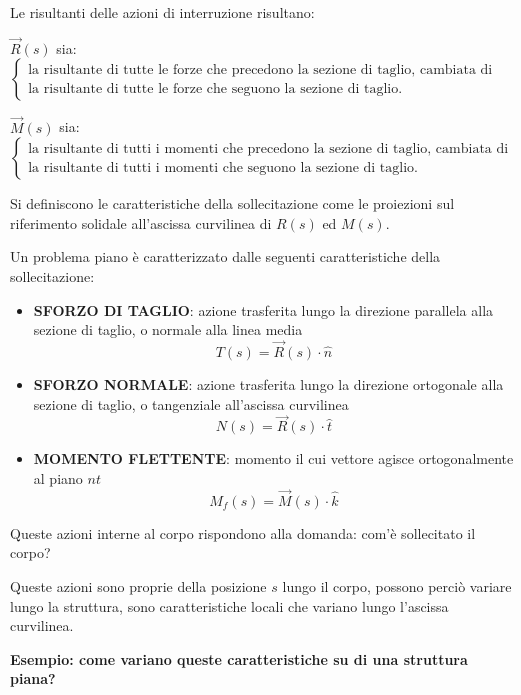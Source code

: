 \documentclass{article}
\begin{document}
\begin{adjustwidth}{2in}{}
	Le risultanti delle azioni di interruzione risultano: \newline 

 $\vec{R}(s)$ sia:{\small  \mbox{$
 	\begin{cases}
 		\text{la risultante di tutte le forze che precedono la sezione di taglio,  cambiata di segno;} \\
 		\text{la risultante di tutte le forze che seguono la sezione di taglio. }
 	\end{cases}$}}\newline

 $\vec{M}(s)$ sia:{\small  \mbox{$
 		\begin{cases}
 			\text{la risultante di tutti i momenti che precedono la sezione di taglio, cambiata di segno;} \\
 			\text{la risultante di tutti i momenti che seguono la sezione di taglio. }
 		\end{cases}$}}\newline

	Si definiscono le caratteristiche della sollecitazione come le proiezioni sul riferimento solidale all’ascissa
	curvilinea di $ R(s) $ ed $ M(s) $.	\newline 
	
	Un problema piano è caratterizzato dalle seguenti caratteristiche della sollecitazione:

\begin{itemize}
	\item \textbf{SFORZO DI TAGLIO}: azione trasferita lungo la direzione parallela alla sezione di taglio, o normale alla linea media
	\[
	T(s) = \vec{R}(s) \cdot \hat{n}
	\]
	\item \textbf{SFORZO NORMALE}: azione trasferita lungo la direzione ortogonale alla sezione di taglio, o tangenziale all'ascissa curvilinea
	\[
	N(s) = \vec{R}(s) \cdot \hat{t}
	\]
	\item \textbf{MOMENTO FLETTENTE}: momento il cui vettore agisce ortogonalmente al piano $ nt $
	\[
	M_f(s) = \vec{M}(s) \cdot \hat{k}
	\]
\end{itemize}

	Queste azioni interne al corpo rispondono alla domanda: com'è sollecitato il corpo? 
	
	Queste azioni sono proprie della posizione $s$ lungo il corpo, possono perciò variare lungo la struttura, sono caratteristiche locali che variano lungo l'ascissa curvilinea. \newline 
	
	\begin{center}
		\textbf{Esempio: come variano queste caratteristiche su di una struttura piana?}
	\end{center}
	

\end{adjustwidth}
\end{document}
